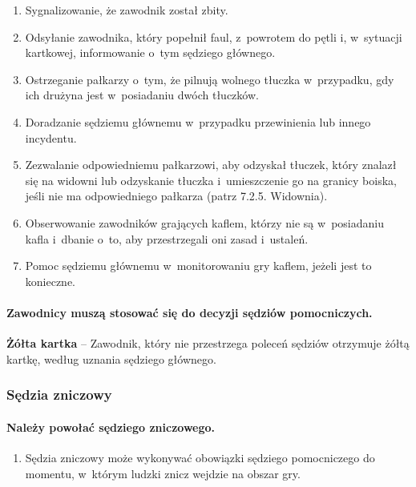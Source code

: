 \documentclass[12pt,a4paper]{article}
\newcommand\yellowcard[1]{\bgroup\textcolor{darkyellow}{\textbf{#1}}}
\begin{document}
\begin{enumerate}
	\item Sygnalizowanie, że zawodnik został zbity.

	\item Odsyłanie zawodnika, który popełnił faul, z~powrotem do pętli i, w~sytuacji kartkowej, informowanie o~tym sędziego głównego.

	\item Ostrzeganie pałkarzy o~tym, że pilnują wolnego tłuczka w~przypadku,
	      gdy ich drużyna jest w~posiadaniu dwóch tłuczków.

	\item Doradzanie sędziemu głównemu w~przypadku przewinienia lub innego
	      incydentu.

	\item Zezwalanie odpowiedniemu pałkarzowi, aby odzyskał tłuczek, który
	      znalazł się na widowni lub odzyskanie tłuczka i~umieszczenie go na
	      granicy boiska, jeśli nie ma odpowiedniego pałkarza (patrz 7.2.5.
	      Widownia).

	\item Obserwowanie zawodników grających kaflem, którzy nie są w~posiadaniu
	      kafla i~dbanie o~to, aby przestrzegali oni zasad i~ustaleń.

	\item Pomoc sędziemu głównemu w~monitorowaniu gry kaflem, jeżeli jest to
	      konieczne.
\end{enumerate}

\paragraph{Zawodnicy muszą stosować się do decyzji sędziów
	pomocniczych.}

\yellowcard{Żółta kartka} -- Zawodnik, który nie przestrzega poleceń sędziów
otrzymuje żółtą kartkę, według uznania sędziego głównego.

\subsubsection{Sędzia zniczowy}

\paragraph{Należy powołać sędziego zniczowego.}

\begin{enumerate}
	\item
	      Sędzia zniczowy może wykonywać obowiązki sędziego pomocniczego do
	      momentu, w~którym ludzki znicz wejdzie na obszar gry.
\end{enumerate}
\end{document}
